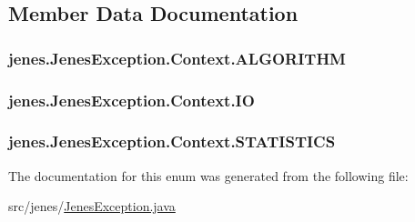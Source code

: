\subsection{Member Data Documentation}
\hypertarget{enumjenes_1_1_jenes_exception_1_1_context_ae925bab13906bd4450260c30cc7b4cab}{
\subsubsection[{A\-L\-G\-O\-R\-I\-T\-H\-M}]{\setlength{\rightskip}{0pt plus 5cm}jenes.\-Jenes\-Exception.\-Context.\-A\-L\-G\-O\-R\-I\-T\-H\-M}}\label{enumjenes_1_1_jenes_exception_1_1_context_ae925bab13906bd4450260c30cc7b4cab}
\hypertarget{enumjenes_1_1_jenes_exception_1_1_context_a023d03d781868c33bd25415d7c5602d0}{
\subsubsection[{I\-O}]{\setlength{\rightskip}{0pt plus 5cm}jenes.\-Jenes\-Exception.\-Context.\-I\-O}}\label{enumjenes_1_1_jenes_exception_1_1_context_a023d03d781868c33bd25415d7c5602d0}
\hypertarget{enumjenes_1_1_jenes_exception_1_1_context_ae0335a1dcf69b5493fac24c4c2c25cd1}{
\subsubsection[{S\-T\-A\-T\-I\-S\-T\-I\-C\-S}]{\setlength{\rightskip}{0pt plus 5cm}jenes.\-Jenes\-Exception.\-Context.\-S\-T\-A\-T\-I\-S\-T\-I\-C\-S}}\label{enumjenes_1_1_jenes_exception_1_1_context_ae0335a1dcf69b5493fac24c4c2c25cd1}


The documentation for this enum was generated from the following file\-:\begin{DoxyCompactItemize}
\item 
src/jenes/\hyperlink{_jenes_exception_8java}{Jenes\-Exception.\-java}\end{DoxyCompactItemize}
